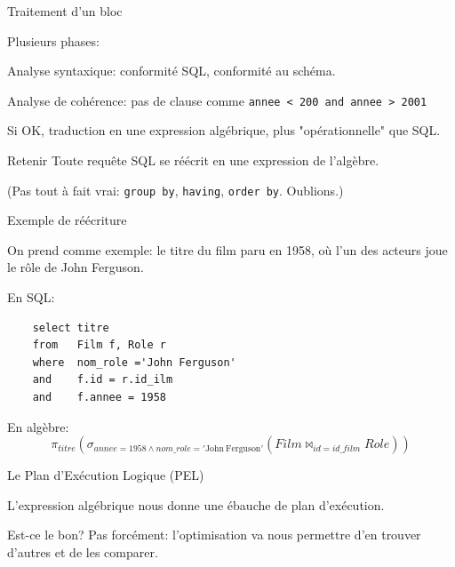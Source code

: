 \begin{frame}[fragile]{Traitement d'un bloc}

Plusieurs phases:

\vfill

\alert{Analyse syntaxique}: conformité SQL, conformité au schéma.

\vfill

\alert{Analyse de cohérence}: pas de clause comme \texttt{annee < 200 and annee > 2001}

\vfill

Si OK, traduction en une expression algébrique, plus "opérationnelle" que SQL.

\vfill

\begin{block}{Retenir}
Toute requête SQL se réécrit en une expression de l'algèbre.
\end{block}

\vfill

(Pas tout à fait vrai: \texttt{group by}, \texttt{having}, \texttt{order by}. Oublions.)
\end{frame}


\begin{frame}[fragile]{Exemple de réécriture}

On prend comme exemple: le titre du film paru en 1958, où l'un des acteurs joue
le rôle de John Ferguson.

\vfill

En SQL:

 \begin{verbatim}
    select titre
    from   Film f, Role r
    where  nom_role ='John Ferguson'
    and    f.id = r.id_ilm
    and    f.annee = 1958
\end{verbatim}

\vfill

En algèbre:
\[
  \pi_{titre}(\sigma_{annee=1958 \land nom\_role='\mathrm{John\ Ferguson}'}(Film \Join_{id=id\_film} Role))
\]

\end{frame}


\begin{frame}[fragile]{Le Plan d'Exécution Logique (PEL)}

L'expression algébrique nous donne une ébauche de plan d'exécution.

\vfill


\vfill

Est-ce le bon? Pas forcément: \alert{l'optimisation} va nous permettre d'en trouver
d'autres et de les comparer.

\end{frame}